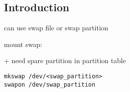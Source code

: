 
\subsection{Introduction}

can use swap file or swap partition

mount swap:

+ need spare partition in partition table

\begin{verbatim}
mkswap /dev/<swap_partition>
swapon /dev/swap_partition
\end{verbatim}

